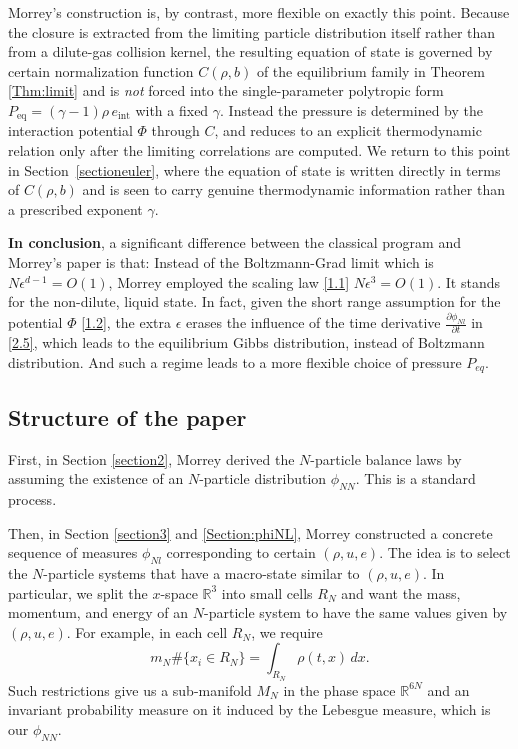 \documentclass[11pt]{article}
\begin{document}
Morrey's construction is, by contrast, more flexible on exactly this point.
Because the closure is extracted from the limiting particle distribution
itself rather than from a dilute-gas collision kernel, the resulting equation
of state is governed by certain normalization function $C(\rho,b)$ of the
equilibrium family in Theorem \ref{Thm:limit} and is \emph{not} forced into the single-parameter
polytropic form $P_{\mathrm{eq}}=(\gamma-1)\rho\, e_{\mathrm{int}}$ with a
fixed $\gamma$. Instead the pressure is determined by the interaction
potential $\Phi$ through $C$, and reduces to an explicit thermodynamic
relation only after the limiting correlations are computed. We return to this
point in Section~\ref{sectioneuler}, where the equation of state is written
directly in terms of $C(\rho,b)$ and is seen to carry genuine thermodynamic
information rather than a prescribed exponent $\gamma$.

\textbf{In conclusion}, a significant difference between the classical program  \cite{BardosGolseLevermore1991, GallagherSaintRaymondTexier2014,
DengHaniMa2025} and Morrey's paper \cite{Morrey1955} is that: Instead of the Boltzmann-Grad limit which is $N\epsilon^{d-1}=O(1)$, Morrey employed the scaling law \eqref{1.1} $N\epsilon^3=O(1)$. It stands for the non-dilute, liquid state. In fact, given the short range assumption for the potential $\Phi$ \eqref{1.2}, the extra $\epsilon$ erases the influence of the time derivative $\frac{\partial \phi_{Nl}}{\partial t}$ in \eqref{2.5}, which leads to the equilibrium Gibbs distribution, instead of Boltzmann distribution. And such a regime leads to a more flexible choice of pressure $P_{eq}$. 


\subsection{Structure of the paper}
First, in Section \ref{section2}, Morrey derived the $N$-particle balance laws by assuming the existence of an $N$-particle distribution $\phi_{NN}$. This is a standard process.

Then, in Section \ref{section3} and \ref{Section:phiNL}, Morrey constructed a concrete sequence of measures $\phi_{Nl}$ corresponding to certain $(\rho,u,e)$. The idea is to select the $N$-particle systems that have a macro-state similar to $(\rho,u,e)$. In particular, we split the $x$-space $\mathbb{R}^3$ into small cells $R_N$ and want the mass, momentum, and energy of an $N$-particle system to have the same values given by $(\rho,u,e)$. For example, in each cell $R_N$, we require
\[
m_N\#\{x_i\in R_N\}=\int_{R_N}\rho(t,x)\,dx.
\]
Such restrictions give us a sub-manifold $M_N$ in the phase space $\mathbb{R}^{6N}$ and an invariant probability measure on it induced by the Lebesgue measure, which is our $\phi_{NN}$.
\end{document}
